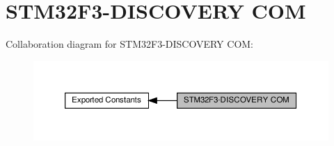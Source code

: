 \hypertarget{group__STM32F3__DISCOVERY__COM}{}\section{S\+T\+M32\+F3-\/\+D\+I\+S\+C\+O\+V\+E\+RY C\+OM}
\label{group__STM32F3__DISCOVERY__COM}
Collaboration diagram for S\+T\+M32\+F3-\/\+D\+I\+S\+C\+O\+V\+E\+RY C\+OM\+:\nopagebreak
\begin{figure}[H]
\begin{center}
\leavevmode
\includegraphics[width=350pt]{group__STM32F3__DISCOVERY__COM}
\end{center}
\end{figure}
